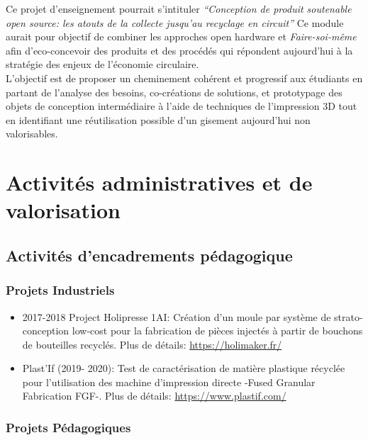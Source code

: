 \documentclass[
  12pt,
  oneside]{book}
\begin{document}
Ce projet d'enseignement pourrait s'intituler \emph{``Conception de produit soutenable open source: les atouts de la collecte jusqu'au recyclage en circuit''}
Ce module aurait pour objectif de combiner les approches open hardware et \emph{Faire-soi-même} afin d'eco-concevoir des produits et des procédés qui répondent aujourd'hui à la stratégie des enjeux de l'économie circulaire.\\
L'objectif est de proposer un cheminement cohérent et progressif aux étudiants en partant de l'analyse des besoins, co-créations de solutions, et prototypage des objets de conception intermédiaire à l'aide de techniques de l'impression 3D tout en identifiant une réutilisation possible d'un gisement aujourd'hui non valorisables.

\hypertarget{activituxe9s-administratives-et-de-valorisation}{%
\chapter{Activités administratives et de valorisation}\label{activituxe9s-administratives-et-de-valorisation}}

\hypertarget{activituxe9s-dencadrements-puxe9dagogique}{%
\section{Activités d'encadrements pédagogique}\label{activituxe9s-dencadrements-puxe9dagogique}}

\hypertarget{projets-industriels}{%
\subsection{Projets Industriels}\label{projets-industriels}}

\begin{itemize}
\item
  2017-2018 Project Holipresse 1AI: Création d'un moule par système de strato-conception low-cost pour la fabrication de pièces injectés à partir de bouchons de bouteilles recyclés.
  Plus de détails: \url{https://holimaker.fr/}
\item
  Plast'If (2019- 2020): Test de caractérisation de matière plastique récyclée pour l'utilisation des machine d'impression directe -Fused Granular Fabrication FGF-.
  Plus de détails: \url{https://www.plastif.com/}
\end{itemize}

\hypertarget{projets-puxe9dagogiques}{%
\subsection{Projets Pédagogiques}\label{projets-puxe9dagogiques}}
\end{document}
